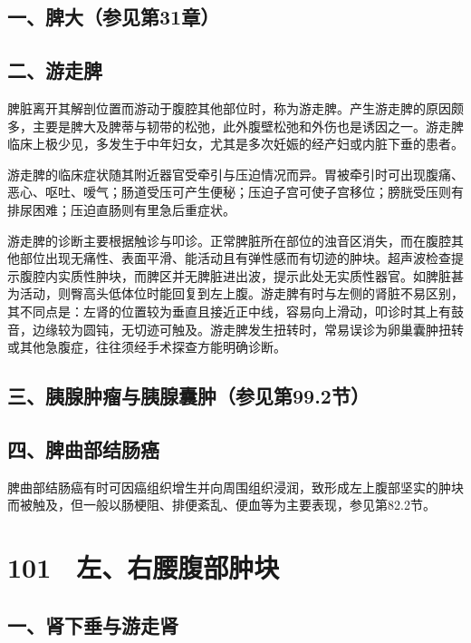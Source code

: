\subsection{一、脾大（参见第31章）}

\subsection{二、游走脾}

脾脏离开其解剖位置而游动于腹腔其他部位时，称为游走脾。产生游走脾的原因颇多，主要是脾大及脾蒂与韧带的松弛，此外腹壁松弛和外伤也是诱因之一。游走脾临床上极少见，多发生于中年妇女，尤其是多次妊娠的经产妇或内脏下垂的患者。

游走脾的临床症状随其附近器官受牵引与压迫情况而异。胃被牵引时可出现腹痛、恶心、呕吐、嗳气；肠道受压可产生便秘；压迫子宫可使子宫移位；膀胱受压则有排尿困难；压迫直肠则有里急后重症状。

游走脾的诊断主要根据触诊与叩诊。正常脾脏所在部位的浊音区消失，而在腹腔其他部位出现无痛性、表面平滑、能活动且有弹性感而有切迹的肿块。超声波检查提示腹腔内实质性肿块，而脾区并无脾脏进出波，提示此处无实质性器官。如脾脏甚为活动，则臀高头低体位时能回复到左上腹。游走脾有时与左侧的肾脏不易区别，其不同点是：左肾的位置较为垂直且接近正中线，容易向上滑动，叩诊时其上有鼓音，边缘较为圆钝，无切迹可触及。游走脾发生扭转时，常易误诊为卵巢囊肿扭转或其他急腹症，往往须经手术探查方能明确诊断。

\subsection{三、胰腺肿瘤与胰腺囊肿（参见第99.2节）}

\subsection{四、脾曲部结肠癌}

脾曲部结肠癌有时可因癌组织增生并向周围组织浸润，致形成左上腹部坚实的肿块而被触及，但一般以肠梗阻、排便紊乱、便血等为主要表现，参见第82.2节。

\protect\hypertarget{text00232.html}{}{}

\section{101　左、右腰腹部肿块}

\subsection{一、肾下垂与游走肾}

